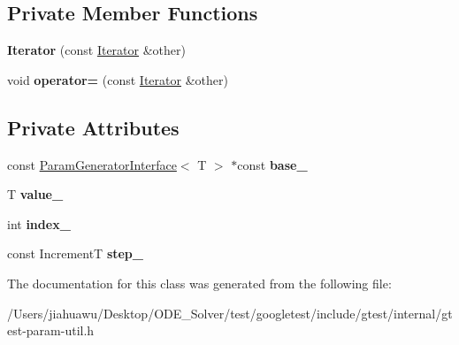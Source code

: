 \subsection*{Private Member Functions}
\begin{DoxyCompactItemize}
\item 
\mbox{\label{classtesting_1_1internal_1_1_range_generator_1_1_iterator_a14150df56c79ae26f1beaea1e7548ebc}} 
{\bfseries Iterator} (const \mbox{\hyperlink{classtesting_1_1internal_1_1_range_generator_1_1_iterator}{Iterator}} \&other)
\item 
\mbox{\label{classtesting_1_1internal_1_1_range_generator_1_1_iterator_acd95aafca4a92db473dd4a88bbc9ab1b}} 
void {\bfseries operator=} (const \mbox{\hyperlink{classtesting_1_1internal_1_1_range_generator_1_1_iterator}{Iterator}} \&other)
\end{DoxyCompactItemize}
\subsection*{Private Attributes}
\begin{DoxyCompactItemize}
\item 
\mbox{\label{classtesting_1_1internal_1_1_range_generator_1_1_iterator_aa6767ad52e3cbd87c457fb5b8b6a21d9}} 
const \mbox{\hyperlink{classtesting_1_1internal_1_1_param_generator_interface}{Param\+Generator\+Interface}}$<$ T $>$ $\ast$const {\bfseries base\+\_\+}
\item 
\mbox{\label{classtesting_1_1internal_1_1_range_generator_1_1_iterator_aab59a7070669d64348494a1fb1795934}} 
T {\bfseries value\+\_\+}
\item 
\mbox{\label{classtesting_1_1internal_1_1_range_generator_1_1_iterator_a2e9064f8da43367550e82eea8adabc2c}} 
int {\bfseries index\+\_\+}
\item 
\mbox{\label{classtesting_1_1internal_1_1_range_generator_1_1_iterator_a18ebb51d061695f102c2ef74cade8618}} 
const IncrementT {\bfseries step\+\_\+}
\end{DoxyCompactItemize}


The documentation for this class was generated from the following file\+:\begin{DoxyCompactItemize}
\item 
/\+Users/jiahuawu/\+Desktop/\+O\+D\+E\+\_\+\+Solver/test/googletest/include/gtest/internal/gtest-\/param-\/util.\+h\end{DoxyCompactItemize}
